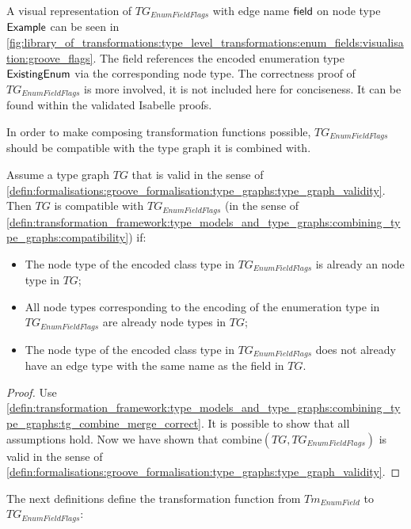 A visual representation of $TG_{EnumFieldFlags}$ with edge name $\mathsf{field}$ on node type $\mathsf{Example}$ can be seen in \cref{fig:library_of_transformations:type_level_transformations:enum_fields:visualisation:groove_flags}. The field references the encoded enumeration type $\mathsf{ExistingEnum}$ via the corresponding node type. The correctness proof of $TG_{EnumFieldFlags}$ is more involved, it is not included here for conciseness. It can be found within the validated Isabelle proofs.

In order to make composing transformation functions possible, $TG_{EnumFieldFlags}$ should be compatible with the type graph it is combined with.

\begin{thm}
\label{defin:library_of_transformations:type_level_transformations:enum_fields:tg_enum_as_flags_field_as_edge_type_combine_correct}
Assume a type graph $TG$ that is valid in the sense of \cref{defin:formalisations:groove_formalisation:type_graphs:type_graph_validity}. Then $TG$ is compatible with $TG_{EnumFieldFlags}$ (in the sense of \cref{defin:transformation_framework:type_models_and_type_graphs:combining_type_graphs:compatibility}) if:
\begin{itemize}
    \item The node type of the encoded class type in $TG_{EnumFieldFlags}$ is already an node type in $TG$;
    \item All node types corresponding to the encoding of the enumeration type in $TG_{EnumFieldFlags}$ are already node types in $TG$;
    \item The node type of the encoded class type in $TG_{EnumFieldFlags}$ does not already have an edge type with the same name as the field in $TG$.
\end{itemize}
\end{thm}

\begin{proof}
Use \cref{defin:transformation_framework:type_models_and_type_graphs:combining_type_graphs:tg_combine_merge_correct}. It is possible to show that all assumptions hold. Now we have shown that $\mathrm{combine}(TG, TG_{EnumFieldFlags})$ is valid in the sense of \cref{defin:formalisations:groove_formalisation:type_graphs:type_graph_validity}.
\end{proof}

The next definitions define the transformation function from $Tm_{EnumField}$ to $TG_{EnumFieldFlags}$:

